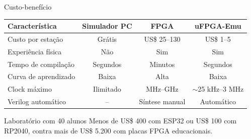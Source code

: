 \documentclass[10pt, aspectratio=169]{beamer}
\begin{document}
\begin{frame}{Custo-benefício}
  \centering
  \small
  \begin{tabular}{lccc}
    \toprule
    Característica & Simulador PC & FPGA & uFPGA-Emu \\
    \midrule
    Custo por estação & Grátis & US\$ 25--130 & \alert{US\$ 1--5} \\
    Experiência física & Não & Sim & \alert{Sim} \\
    Tempo de compilação & Segundos & Minutos & Segundos \\
    Curva de aprendizado & Baixa & Alta & \alert{Baixa} \\
    Clock máximo & Ilimitado & MHz--GHz & $\sim$25 kHz--3 MHz \\
    Verilog automático & -- & Síntese manual & \alert{Automático} \\
    \bottomrule
  \end{tabular}

  \vspace{0.6em}
  \begin{exampleblock}{Laboratório com 40 alunos}
    Menos de \alert{US\$ 400} com ESP32 ou \alert{US\$ 100} com RP2040,
    contra mais de US\$ 5.200 com placas FPGA educacionais.
  \end{exampleblock}
\end{frame}
\end{document}
